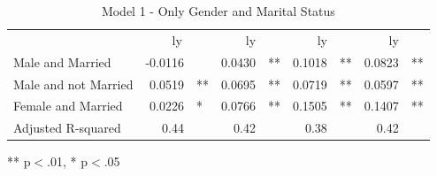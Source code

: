 \documentclass[12pt]{article}
\begin{document}
\begin{spacing}{1.5}
\begin{table}[!h]
\caption{Model 1 - Only Gender and Marital Status}
\centering
\begin{tabular}{lllllllll}
\cline{1-9}
\multicolumn{1}{r}{} &
  \multicolumn{2}{c}{ly} &
  \multicolumn{2}{c}{ly} &
  \multicolumn{2}{c}{ly} &
  \multicolumn{2}{c}{ly} \\
\cline{1-9}
\multicolumn{1}{l}{Male and Married} &
  \multicolumn{1}{r}{-0.0116} &
  \multicolumn{1}{l}{} &
  \multicolumn{1}{r}{0.0430} &
  \multicolumn{1}{l}{**} &
  \multicolumn{1}{r}{0.1018} &
  \multicolumn{1}{l}{**} &
  \multicolumn{1}{r}{0.0823} &
  \multicolumn{1}{l}{**} \\
\multicolumn{1}{l}{Male and not Married} &
  \multicolumn{1}{r}{0.0519} &
  \multicolumn{1}{l}{**} &
  \multicolumn{1}{r}{0.0695} &
  \multicolumn{1}{l}{**} &
  \multicolumn{1}{r}{0.0719} &
  \multicolumn{1}{l}{**} &
  \multicolumn{1}{r}{0.0597} &
  \multicolumn{1}{l}{**} \\
\multicolumn{1}{l}{Female and Married} &
  \multicolumn{1}{r}{0.0226} &
  \multicolumn{1}{l}{*} &
  \multicolumn{1}{r}{0.0766} &
  \multicolumn{1}{l}{**} &
  \multicolumn{1}{r}{0.1505} &
  \multicolumn{1}{l}{**} &
  \multicolumn{1}{r}{0.1407} &
  \multicolumn{1}{l}{**} \\
\multicolumn{1}{l}{Adjusted R-squared} &
  \multicolumn{1}{r}{0.44} &
  \multicolumn{1}{l}{} &
  \multicolumn{1}{r}{0.42} &
  \multicolumn{1}{l}{} &
  \multicolumn{1}{r}{0.38} &
  \multicolumn{1}{l}{} &
  \multicolumn{1}{r}{0.42} &
  \multicolumn{1}{l}{} \\
\cline{1-9}
\end{tabular}

\footnotesize{
** p$<$.01, * p$<$.05
}
\label{table:gender1}
\end{table}


\end{spacing}
\end{document}
